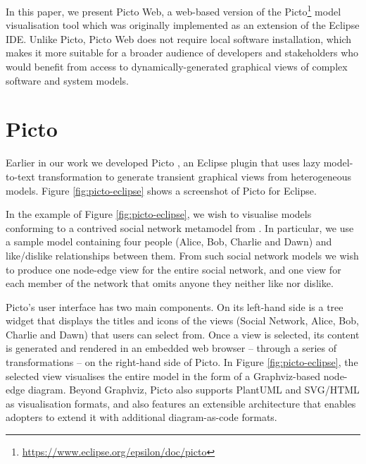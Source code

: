 \documentclass[sigconf,review]{acmart}
\begin{document}

In this paper, we present Picto Web, a web-based version of the Picto\footnote{\url{https://www.eclipse.org/epsilon/doc/picto}} \cite{dimitris2020picto} model visualisation tool which was originally implemented as an extension of the Eclipse IDE. Unlike Picto, Picto Web does not require local software installation, which makes it more suitable for a broader audience of developers and stakeholders who would benefit from access to dynamically-generated graphical views of complex software and system models.

\section{Picto}
\label{sec:picto}

Earlier in our work we developed Picto \cite{dimitris2020picto}, an Eclipse plugin that uses lazy model-to-text transformation to generate transient graphical views from heterogeneous models. Figure \ref{fig:picto-eclipse} shows a screenshot of Picto for Eclipse.


In the example of Figure \ref{fig:picto-eclipse}, we wish to visualise models conforming to a contrived social network metamodel from \cite{dimitris2020picto}. In particular, we use a sample model containing four people (Alice, Bob,  Charlie and Dawn) and like/dislike relationships between them. From such social network models we wish to produce one node-edge view for the entire social network, and one view for each member of the network that omits anyone they neither like nor dislike. 

Picto’s user interface has two main components. On its left-hand side is a tree widget that displays the titles and icons of the views (Social Network, Alice, Bob, Charlie and Dawn) that users can select from. Once a view is selected, its content is generated and rendered in an embedded web browser -- through a series of transformations -- on the right-hand side of Picto. In Figure \ref{fig:picto-eclipse}, the selected view visualises the entire model in the form of a Graphviz-based node-edge diagram. Beyond Graphviz, Picto also supports PlantUML and SVG/HTML as visualisation formats, and also features an extensible architecture that enables adopters to extend it with additional diagram-as-code formats.  
\end{document}
